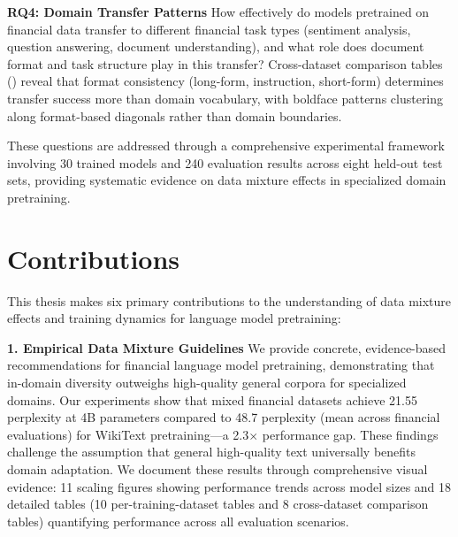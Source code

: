 \textbf{RQ4: Domain Transfer Patterns}
How effectively do models pretrained on financial data transfer to different financial task types (sentiment analysis, question answering, document understanding), and what role does document format and task structure play in this transfer? Cross-dataset comparison tables () reveal that format consistency (long-form, instruction, short-form) determines transfer success more than domain vocabulary, with boldface patterns clustering along format-based diagonals rather than domain boundaries.

These questions are addressed through a comprehensive experimental framework involving 30 trained models and 240 evaluation results across eight held-out test sets, providing systematic evidence on data mixture effects in specialized domain pretraining.

\section{Contributions}

This thesis makes six primary contributions to the understanding of data mixture effects and training dynamics for language model pretraining:

\textbf{1. Empirical Data Mixture Guidelines}
We provide concrete, evidence-based recommendations for financial language model pretraining, demonstrating that in-domain diversity outweighs high-quality general corpora for specialized domains. Our experiments show that mixed financial datasets achieve 21.55 perplexity at 4B parameters compared to 48.7 perplexity (mean across financial evaluations) for WikiText pretraining—a 2.3$\times$ performance gap. These findings challenge the assumption that general high-quality text universally benefits domain adaptation. We document these results through comprehensive visual evidence: 11 scaling figures showing performance trends across model sizes and 18 detailed tables (10 per-training-dataset tables and 8 cross-dataset comparison tables) quantifying performance across all evaluation scenarios.

